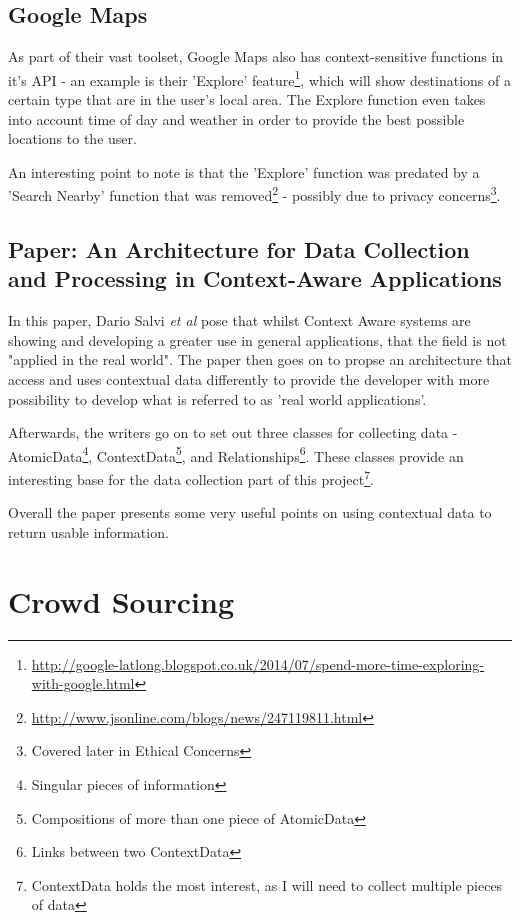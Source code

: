 \documentclass[11pt]{informatics-report}
\begin{document}
\subsection{Google Maps}

As part of their vast toolset, Google Maps also has context-sensitive functions in it's API - an example is their 'Explore' feature\footnote{\url{http://google-latlong.blogspot.co.uk/2014/07/spend-more-time-exploring-with-google.html}}, which will show destinations of a certain type that are in the user's local area. The Explore function even takes into account time of day and weather in order to provide the best possible locations to the user.

An interesting point to note is that the 'Explore' function was predated by a 'Search Nearby' function that was removed\footnote{\url{http://www.jsonline.com/blogs/news/247119811.html}} - possibly due to privacy concerns\footnote{Covered later in Ethical Concerns}.


\subsection{Paper: An Architecture for Data Collection and Processing in Context-Aware Applications\cite{salviarchitecture}}

In this paper, Dario Salvi \textit{et al} pose that whilst Context Aware systems are showing and developing a greater use in general applications, that the field is not "applied in the real world"\cite{salviarchitecture}. The paper then goes on to propse an architecture that access and uses contextual data differently to provide the developer with more possibility to develop what is referred to as 'real world applications'.

Afterwards, the writers go on to set out three classes for collecting data - AtomicData\footnote{Singular pieces of information}, ContextData\footnote{Compositions of more than one piece of AtomicData}, and Relationships\footnote{Links between two ContextData}\cite{salviarchitecture}. These classes provide an interesting base for the data collection part of this project\footnote{ContextData holds the most interest, as I will need to collect multiple pieces of data}.

Overall the paper presents some very useful points on using contextual data to return usable information.

\section{Crowd Sourcing}
\end{document}
